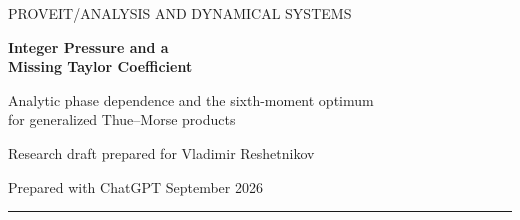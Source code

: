 \documentclass[11pt,a4paper]{article}
\numberwithin{equation}{section}
\theoremstyle{definition}
\theoremstyle{remark}
\begin{document}
\hypersetup{pageanchor=false}
\begin{titlepage}
\setlength{\parindent}{0pt}
\thispagestyle{empty}
{\small\sffamily\color{ink} PROVEIT\quad /\quad ANALYSIS AND DYNAMICAL SYSTEMS}\par
\vspace{18mm}
{\Huge\bfseries\color{ink} Integer Pressure and a\\[3mm] Missing Taylor Coefficient\par}
\vspace{7mm}
{\Large Analytic phase dependence and the sixth-moment optimum\\[2mm]
for generalized Thue--Morse products\par}
\vspace{10mm}
{\large Research draft prepared for Vladimir Reshetnikov\par}
{\normalsize Prepared with ChatGPT\quad\textbullet{} September 2026\par}
\vspace{12mm}
\hrule\vspace{5mm}
\begin{abstract}
For the doubling map and the translated potential
$\psi_c(x)=\log\cos^2\!\pi(x-c)$, we give an explicit finite-dimensional
model of every positive integer pressure $p_m(c)=P(m\psi_c)$.
Its Perron eigenvalue is algebraically simple for every phase, including the
atomic phase $c=0$, and is uniformly separated from the remaining spectrum
when $m$ is fixed. Consequently, every function $c\mapsto p_m(c)$ is
real-analytic. This extends the previously established order-two phase
regularity to all positive integer orders; it does not settle noninteger orders.

The finite model also reveals an all-order cancellation:
$[c^{2m}]p_m(c)=0$. All lower even coefficients are explicit zeta values.
The mechanism is delayed feedback from the second inverse branch, whose
weight first appears in degree $2m$, together with an exact periodized-sinc
Perron eigenfunction at $c=0$.

A separate exact optimization result shows that the classical Thue--Morse
phase $c=1/2$ minimizes the fourth-moment growth rate but is a strict local
maximum for the sixth-moment rate. We characterize the two global
sixth-moment minimizers by a degree-fourteen polynomial and certify their
uniqueness using rational Sturm and interval arithmetic. One minimizer is
approximately $0.364919195551255$.


\end{abstract}
\end{titlepage}
\end{document}
